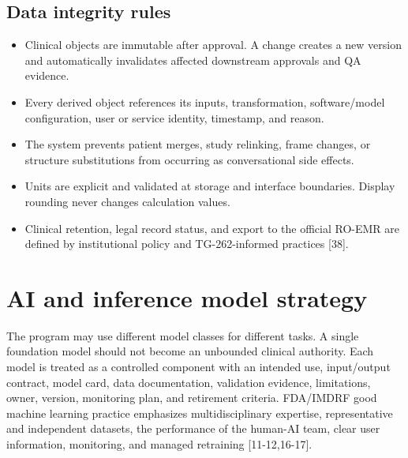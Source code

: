 \documentclass[11pt,letterpaper]{article}
\begin{document}
\subsection{Data integrity rules}

\begin{itemize}
\item Clinical objects are immutable after approval. A change creates a new version and automatically invalidates affected downstream approvals and QA evidence.
\item Every derived object references its inputs, transformation, software\slash\allowbreak{}model configuration, user or service identity, timestamp, and reason.
\item The system prevents patient merges, study relinking, frame changes, or structure substitutions from occurring as conversational side effects.
\item Units are explicit and validated at storage and interface boundaries. Display rounding never changes calculation values.
\item Clinical retention, legal record status, and export to the official RO-EMR are defined by institutional policy and TG-262-informed practices [38].
\end{itemize}

\section{AI and inference model strategy}

The program may use different model classes for different tasks. A single foundation model should not become an unbounded clinical authority. Each model is treated as a controlled component with an intended use, input\slash\allowbreak{}output contract, model card, data documentation, validation evidence, limitations, owner, version, monitoring plan, and retirement criteria. FDA\slash\allowbreak{}IMDRF good machine learning practice emphasizes multidisciplinary expertise, representative and independent datasets, the performance of the human-AI team, clear user information, monitoring, and managed retraining [11-12,16-17].
\end{document}
